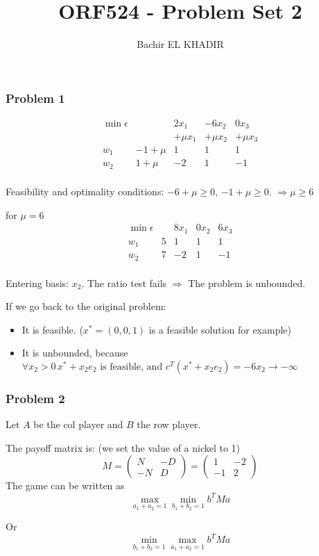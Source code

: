 \documentclass[12pt]{article}
\title{ORF524 - Problem Set 2}
\author{Bachir EL KHADIR }
\newcommand{\Q}[1]{\subsubsection*{Problem #1}}
\begin{document}
\maketitle
\Q{1}



\[
\begin{array}{l|r|r|r|r}
\min \epsilon &    & 2 x_1 & -6 x_2 & 0x_3\\
         &    &    +\mu x_1 &  +\mu x_2 & +\mu x_3\\
\hline
w_1      & -1+\mu & 1 & 1 & 1\\
w_2      &  1+\mu & -2 & 1 & -1\\
\end{array}
\]

Feasibility and optimality conditions:
$ -6 + \mu \geq 0$,
$ -1 + \mu \geq 0$. $\Rightarrow \mu \geq 6$ 

for $\mu = 6$
\[
\begin{array}{l|r|r|r|r}
\min \epsilon &    & 8 x_1 & 0 x_2 & 6 x_3\\
\hline
w_1      & 5 & 1 & 1 & 1\\
w_2      & 7 & -2 & 1 & -1\\
\end{array}
\]

Entering basis: $x_2$. The ratio test fails $\Rightarrow$ The problem is unbounded.

If we go back to the original problem: 
\begin{itemize}
\item It is feasible. ($x^* = (0, 0, 1)$ is a feasible solution for example)
\item It is unbounded, because $\forall x_2 > 0 \,  x^*+x_2 e_2 \text{ is feasible, and }  c^T(x^*+x_2 e_2) = -6 x_2 \rightarrow -\infty$
\end{itemize}


\Q{2}
Let $A$ be the col player and $B$ the row player.

The payoff matrix is: (we set the value of a nickel to 1)
\[ M = \left(\begin{array}{cc}N&-D\\-N&D \end{array} \right)
= \left(\begin{array}{cc}1&-2\\-1&2 \end{array} \right)
 \]
The game can be written as $$\max_{a_1 + a_2 = 1} \min_{b_1 + b_2 = 1} b^T M a $$

Or $$ \min_{b_1 + b_2 = 1} \max_{a_1 + a_2 = 1} b^T M a $$
\end{document}
